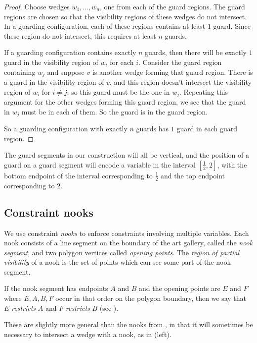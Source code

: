 \begin{proof}
Choose wedges $w_1,\dots,w_n$, one from each of the guard regions. The guard regions are chosen so that the visibility regions of these wedges do not intersect. In a guarding configuration, each of these regions contains at least $1$ guard. Since these region do not intersect, this requires at least $n$ guards.

If a guarding configuration contains exactly $n$ guards, then there will be exactly $1$ guard in the visibility region of $w_i$ for each $i$. Consider the guard region containing $w_j$ and suppose $v$ is another wedge forming that guard region. There is a guard in the visibility region of $v$, and this region doesn't intersect the visibility region of $w_i$ for $i\ne j$, so this guard must be the one in $w_j$. Repeating this argument for the other wedges forming this guard region, we see that the guard in $w_j$ must be in each of them. So the guard is in the guard region.

So a guarding configuration with exactly $n$ guards has $1$ guard in each guard region.
\end{proof}

The guard segments in our construction will all be vertical, and the position of a guard on a guard segment will encode a variable in the interval $[\frac12, 2]$, with the bottom endpoint of the interval corresponding to $\frac12$ and the top endpoint corresponding to $2$. 

\subsection{Constraint nooks}

We use constraint \emph{nooks} to enforce constraints involving multiple variables. Each nook consists of a line segment on the boundary of the art gallery, called the \emph{nook segment}, and two polygon vertices called \emph{opening points}. The \emph{region of partial visibility} of a nook is the set of points which can see some part of the nook segment.

If the nook segment has endpoints $A$ and $B$ and the opening points are $E$ and $F$ where $E, A, B, F$ occur in that order on the polygon boundary, then we say that $E$ \emph{restricts} $A$ and $F$ \emph{restricts} $B$ (see ).

These are slightly more general than the nooks from \cite{ExistsRHardness}, in that it will sometimes be necessary to intersect a wedge with a nook, as in  (left).

